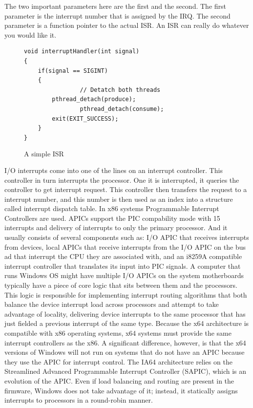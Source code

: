 \documentclass[letterpaper,10pt,draftclsnofoot,onecolumn]{IEEEtran}
\begin{document}
The two important parameters here are the first and the second. The first parameter is the interrupt number that is assigned by the IRQ. The second parameter is a function pointer to the actual ISR. An ISR can really do whatever you would like it. 

\begin{figure}[H]
\caption{A simple ISR}
\begin{lstlisting}
void interruptHandler(int signal)
{
	if(signal == SIGINT)
	{
                // Detatch both threads
		pthread_detach(produce);
                pthread_detach(consume);
		exit(EXIT_SUCCESS);
	}
}
\end{lstlisting}
\end{figure}

I/O interrupts come into one of the lines on an interrupt controller. This controller in turn interrupts the processor. One it is interrupted, it queries the controller to get interrupt request. This controller then transfers the request to a interrupt number, and this number is then used as an index into a structure called interrupt dispatch table. 
In x86 systems Programmable Interrupt Controllers are used. APICs support the PIC compability mode with 15 interrupts and delivery of interrupts to only the primary processor. And it usually consists of several components such as: I/O APIC that receives interrupts from devices, local APICs that receive interrupts from the I/O APIC on the bus ad that interrupt the CPU they are associated with, and an i8259A compatible interrupt controller that translates its input into PIC signals. A computer that runs Windows OS might have multiple I/O APICs on the system motherboards typically have a piece of core logic that sits between them and the processors. 
This logic is responsible for implementing interrupt routing algorithms that both balance the device interrupt load across processors and attempt to take advantage of locality, delivering device interrupts to the same processor that has just fielded a previous interrupt of the same type.\cite{[1]}
Because the x64 architecture is compatible with x86 operating systems, x64 systems must provide the same interrupt controllers as the x86. A significant difference, however, is that the x64 versions of Windows will not run on systems that do not have an APIC because they use the APIC for interrupt control.\cite{[1]}
The IA64 architecture relies on the Streamlined Advanced Programmable Interrupt Controller (SAPIC), which is an evolution of the APIC. Even if load balancing and routing are present in the firmware, Windows does not take advantage of it; instead, it statically assigns interrupts to processors in a round-robin manner.\cite{[1]}
\end{document}
